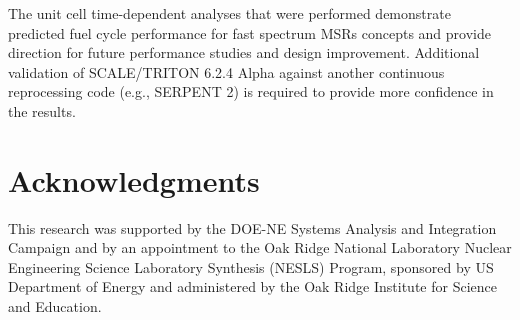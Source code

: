 \documentclass{anstrans}
\begin{document}
The unit cell time-dependent analyses that were performed demonstrate predicted fuel cycle performance for fast spectrum \glspl{MSR} concepts and provide direction for future performance studies and design improvement. Additional validation of SCALE/TRITON 6.2.4 Alpha against another continuous reprocessing code (e.g., SERPENT 2) is required to provide more confidence in the results.

\section{Acknowledgments}
This research was supported by the DOE-NE Systems Analysis and Integration Campaign and by an appointment to the Oak Ridge National Laboratory Nuclear Engineering Science Laboratory Synthesis (NESLS) Program, sponsored by US Department of Energy and administered by the Oak Ridge Institute for Science and Education.



\end{document}
